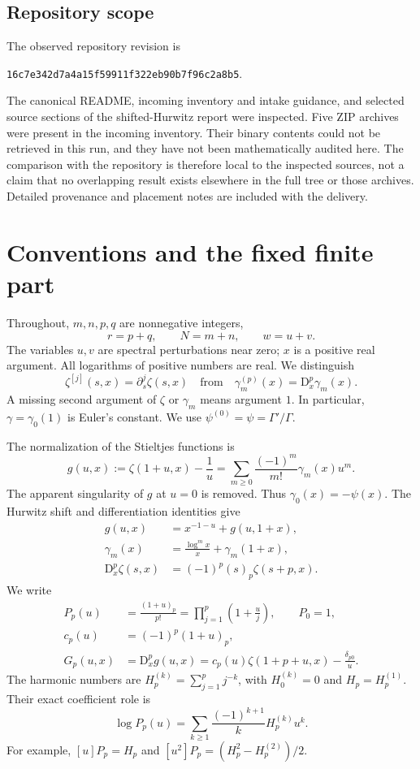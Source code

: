 \documentclass[11pt,a4paper]{article}
\numberwithin{equation}{section}
\theoremstyle{definition}
\newcommand{\D}{\mathrm D}
\newcommand{\cscpin}{\texttt{16c7e342d7a4a15f59911f322eb90b7f96c2a8b5}}
\begin{document}
\subsection{Repository scope}
The observed repository revision is
\begin{center}\small\cscpin.\end{center}
The canonical README, incoming inventory and intake guidance, and selected source sections of the shifted-Hurwitz report were inspected. Five ZIP archives were present in the incoming inventory. Their binary contents could not be retrieved in this run, and they have not been mathematically audited here. The comparison with the repository is therefore local to the inspected sources, not a claim that no overlapping result exists elsewhere in the full tree or those archives. Detailed provenance and placement notes are included with the delivery.

\section{Conventions and the fixed finite part}\label{csc:conventions}
Throughout, $m,n,p,q$ are nonnegative integers,
\[
r=p+q,\qquad N=m+n,\qquad w=u+v.
\]
The variables $u,v$ are spectral perturbations near zero; $x$ is a positive real argument. All logarithms of positive numbers are real. We distinguish
\[
\zeta^{[j]}(s,x)=\partial_s^j\zeta(s,x)
\quad\text{from}\quad
\gamma_m^{(p)}(x)=\D_x^p\gamma_m(x).
\]
A missing second argument of $\zeta$ or $\gamma_m$ means argument $1$. In particular, $\gamma=\gamma_0(1)$ is Euler's constant. We use $\psi^{(0)}=\psi=\Gamma'/\Gamma$.

The normalization of the Stieltjes functions is
\begin{equation}\label{csc:gdef}
g(u,x):=\zeta(1+u,x)-\frac1u
=\sum_{m\ge0}\frac{(-1)^m}{m!}\gamma_m(x)u^m.
\end{equation}
The apparent singularity of $g$ at $u=0$ is removed. Thus $\gamma_0(x)=-\psi(x)$. The Hurwitz shift and differentiation identities \cite{csc:DLMFhurwitz} give
\begin{align}
g(u,x)&=x^{-1-u}+g(u,1+x),\label{csc:gshift}\\
\gamma_m(x)&=\frac{\log^m x}{x}+\gamma_m(1+x),\label{csc:gmshift}\\
\D_x^p\zeta(s,x)&=(-1)^p(s)_p\zeta(s+p,x).\label{csc:hurwitzD}
\end{align}
We write
\begin{align}
P_p(u)&=\frac{(1+u)_p}{p!}=\prod_{j=1}^{p}\left(1+\frac uj\right),\qquad P_0=1,\label{csc:Pdef}\\
c_p(u)&=(-1)^p(1+u)_p,\label{csc:cdef}\\
G_p(u,x)&=\D_x^pg(u,x)
=c_p(u)\zeta(1+p+u,x)-\frac{\delta_{p0}}u.\label{csc:Gdef}
\end{align}
The harmonic numbers are $H_p^{(k)}=\sum_{j=1}^p j^{-k}$, with $H_0^{(k)}=0$ and $H_p=H_p^{(1)}$. Their exact coefficient role is
\begin{equation}\label{csc:Pharmonic}
\log P_p(u)=\sum_{k\ge1}\frac{(-1)^{k+1}}k H_p^{(k)}u^k.
\end{equation}
For example, $[u]P_p=H_p$ and $[u^2]P_p=(H_p^2-H_p^{(2)})/2$.
\end{document}

